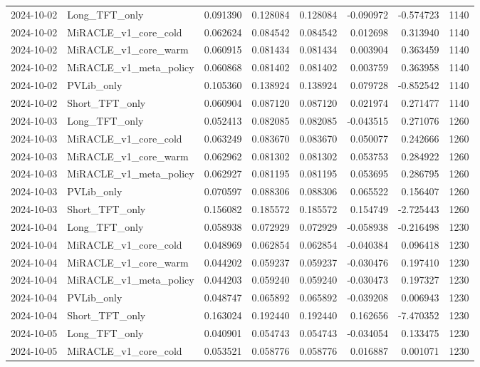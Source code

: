\begin{tabular}{llrrrrrr}
2024-10-02 & Long_TFT_only & 0.091390 & 0.128084 & 0.128084 & -0.090972 & -0.574723 & 1140 \\
2024-10-02 & MiRACLE_v1_core_cold & 0.062624 & 0.084542 & 0.084542 & 0.012698 & 0.313940 & 1140 \\
2024-10-02 & MiRACLE_v1_core_warm & 0.060915 & 0.081434 & 0.081434 & 0.003904 & 0.363459 & 1140 \\
2024-10-02 & MiRACLE_v1_meta_policy & 0.060868 & 0.081402 & 0.081402 & 0.003759 & 0.363958 & 1140 \\
2024-10-02 & PVLib_only & 0.105360 & 0.138924 & 0.138924 & 0.079728 & -0.852542 & 1140 \\
2024-10-02 & Short_TFT_only & 0.060904 & 0.087120 & 0.087120 & 0.021974 & 0.271477 & 1140 \\
2024-10-03 & Long_TFT_only & 0.052413 & 0.082085 & 0.082085 & -0.043515 & 0.271076 & 1260 \\
2024-10-03 & MiRACLE_v1_core_cold & 0.063249 & 0.083670 & 0.083670 & 0.050077 & 0.242666 & 1260 \\
2024-10-03 & MiRACLE_v1_core_warm & 0.062962 & 0.081302 & 0.081302 & 0.053753 & 0.284922 & 1260 \\
2024-10-03 & MiRACLE_v1_meta_policy & 0.062927 & 0.081195 & 0.081195 & 0.053695 & 0.286795 & 1260 \\
2024-10-03 & PVLib_only & 0.070597 & 0.088306 & 0.088306 & 0.065522 & 0.156407 & 1260 \\
2024-10-03 & Short_TFT_only & 0.156082 & 0.185572 & 0.185572 & 0.154749 & -2.725443 & 1260 \\
2024-10-04 & Long_TFT_only & 0.058938 & 0.072929 & 0.072929 & -0.058938 & -0.216498 & 1230 \\
2024-10-04 & MiRACLE_v1_core_cold & 0.048969 & 0.062854 & 0.062854 & -0.040384 & 0.096418 & 1230 \\
2024-10-04 & MiRACLE_v1_core_warm & 0.044202 & 0.059237 & 0.059237 & -0.030476 & 0.197410 & 1230 \\
2024-10-04 & MiRACLE_v1_meta_policy & 0.044203 & 0.059240 & 0.059240 & -0.030473 & 0.197327 & 1230 \\
2024-10-04 & PVLib_only & 0.048747 & 0.065892 & 0.065892 & -0.039208 & 0.006943 & 1230 \\
2024-10-04 & Short_TFT_only & 0.163024 & 0.192440 & 0.192440 & 0.162656 & -7.470352 & 1230 \\
2024-10-05 & Long_TFT_only & 0.040901 & 0.054743 & 0.054743 & -0.034054 & 0.133475 & 1230 \\
2024-10-05 & MiRACLE_v1_core_cold & 0.053521 & 0.058776 & 0.058776 & 0.016887 & 0.001071 & 1230 \\

\end{tabular}

